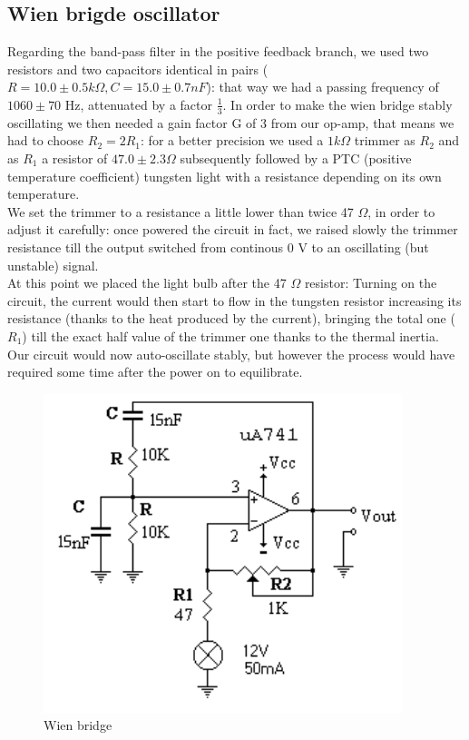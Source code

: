 \subsection{Wien brigde oscillator}
Regarding the band-pass filter in the positive feedback branch, we used two resistors and two capacitors identical in pairs ($R = 10.0 \pm 0.5 k\Omega, C = 15.0 \pm 0.7 nF$): that way we had a passing frequency of $1060 \pm 70$ Hz, attenuated by a factor $\frac{1}{3}$. 
In order to make the wien bridge stably oscillating we then needed a gain factor G of 3 from our op-amp, that means we had to choose $R_2 = 2 R_1$: for a better precision we used a $1 k\Omega$ trimmer as $R_2$ and as $R_1$ a resistor of $47.0 \pm 2.3 \Omega$ subsequently followed by a PTC (positive temperature coefficient) tungsten light with a resistance depending on its own temperature.\\
We set the trimmer to a resistance a little lower than twice 47 $\Omega$, in order to adjust it carefully: once powered the circuit in fact, we raised slowly the trimmer resistance till the output switched from continous 0 V to an oscillating (but unstable) signal.\\
At this point we placed the light bulb after the 47 $\Omega$ resistor: Turning on the circuit, the current would then start to flow in the tungsten resistor increasing its resistance (thanks to the heat produced by the current), bringing the total one ($R_1$) till the exact half value of the trimmer one thanks to the thermal inertia.\\
Our circuit would now auto-oscillate stably, but however the process would have required some time after the power on to equilibrate.
\begin{figure}[H]
\centering
\includegraphics[width=.7\textwidth]{9/wien.png}
\caption{Wien bridge}\label{wien}
\end{figure}

